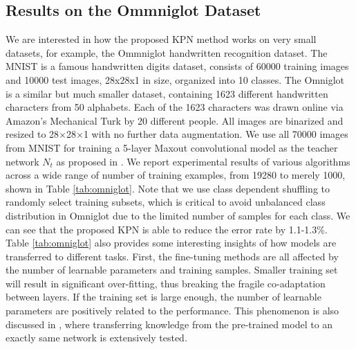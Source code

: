 \documentclass[journal]{IEEEtran}
\begin{document}
\subsection{Results on the Ommniglot Dataset}
We are interested in how the proposed KPN method works on very small datasets, for example, the Ommniglot handwritten recognition dataset. 
The MNIST \cite{lecun1998gradient} is a famous handwritten digits dataset, consists of 60000 training images and 10000 test images, 28x28x1 in size, organized into 10 classes. The Omniglot \cite{lake2015human} is a similar but much smaller dataset, containing 1623 different handwritten characters from 50 alphabets. Each of the 1623 characters was drawn online via Amazon's Mechanical Turk by 20 different people. All images are binarized and resized to 28$\times$28$\times$1 with no further data augmentation. We use all 70000 images from MNIST for training a 5-layer Maxout convolutional model as the teacher network $N_t$ as proposed in \cite{goodfellow2013maxout}. We report experimental results of various algorithms across a wide range of number of training examples, from 19280 to merely 1000, shown in Table \ref{tab:omniglot}. Note that we use class dependent shuffling to randomly select training subsets, which is critical to avoid unbalanced class distribution in Omniglot due to the limited number of samples for each class. 
We can see that the proposed KPN is able to reduce the error rate by 1.1-1.3\%. 
Table \ref{tab:omniglot} also provides some interesting insights of how models are transferred to different tasks. 
First, the fine-tuning methods are all affected by the number of learnable parameters and training samples. Smaller training set will result in significant over-fitting, thus breaking the fragile co-adaptation between layers. If the training set is large enough, the number of learnable parameters are positively related to the performance. This phenomenon is also discussed in \cite{yosinski2014transferable}, where transferring knowledge from the pre-trained model to an exactly same network is extensively tested. 
\end{document}
